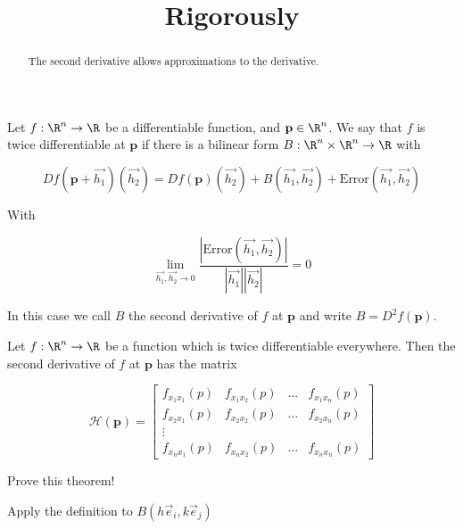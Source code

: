 \documentclass{ximera}
\title{Rigorously}
\begin{document}
	\begin{abstract}
		The second derivative allows approximations to the derivative.
	\end{abstract}
	
\begin{definition}
	Let $f:\R^n \to \R$ be a differentiable function, and $\mathbf{p} \in \R^n$.  We say that $f$ is twice differentiable at $\mathbf{p}$
	if there is a bilinear form $B:\R^n \times \R^n \to \R$ with
	
	\[
		Df(\mathbf{p}+\vec{h_1})(\vec{h_2}) = Df(\mathbf{p})(\vec{h_2})+B(\vec{h_1},\vec{h_2})+\textrm{Error}(\vec{h_1},\vec{h_2})
	\]
	
	With 
	
	\[
		\displaystyle\lim_{\vec{h_1},\vec{h_2} \to 0} \frac{\left| \textrm{Error}(\vec{h_1},\vec{h_2}) \right| }{|\vec{h_1}| |\vec{h_2}|} = 0
	\]
	
	In this case we call $B$ the second derivative of $f$ at $\mathbf{p}$ and write $B =D^2f(\mathbf{p})$.
\end{definition}

\begin{theorem}
	Let $f:\R^n \to \R$ be a function which is twice differentiable everywhere.  Then the second derivative of $f$
	at $\mathbf{p}$ has the matrix
	
	\[ \mathcal{H}(\mathbf{p}) = \begin{bmatrix}
		 f_{x_1x_1}(p) &  f_{x_1x_2}(p) & ... &  f_{x_1x_n}(p)\\ f_{x_2x_1}(p) &  f_{x_2x_2}(p) & ... &  f_{x_2x_n}(p)\\ \vdots \\ f_{x_nx_1}(p) &  f_{x_nx_2}(p) & ... &  f_{x_nx_n}(p)
 \end{bmatrix}\]
\end{theorem}

	Prove this theorem!
	
	
	\begin{hint}
		Apply the definition to $B(h\vec{e}_i,k\vec{e}_j)$
	\end{hint}
	
\end{document}
